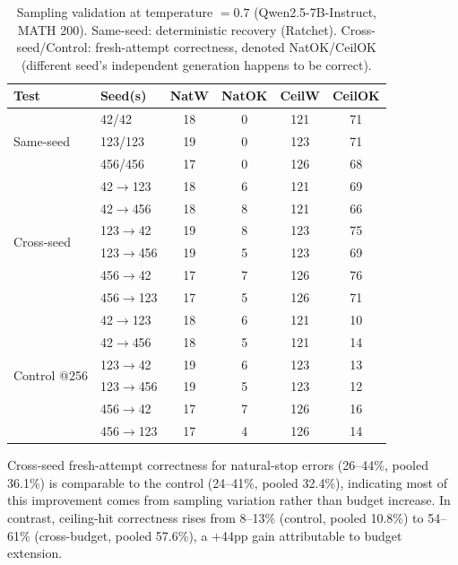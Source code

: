 \documentclass{article}
\begin{document}
\begin{table}[h]
\centering
\caption{Sampling validation at temperature $= 0.7$ (Qwen2.5-7B-Instruct, MATH 200). Same-seed: deterministic recovery (Ratchet). Cross-seed/Control: fresh-attempt correctness, denoted NatOK/CeilOK (different seed's independent generation happens to be correct).}
\label{tab:sampling}
\begin{tabular}{llcccc}
\toprule
\textbf{Test} & \textbf{Seed(s)} & \textbf{NatW} & \textbf{NatOK} & \textbf{CeilW} & \textbf{CeilOK} \\
\midrule
\multirow{3}{*}{Same-seed} & 42/42 & 18 & 0 & 121 & 71 \\
 & 123/123 & 19 & 0 & 123 & 71 \\
 & 456/456 & 17 & 0 & 126 & 68 \\
\midrule
\multirow{6}{*}{Cross-seed} & 42$\to$123 & 18 & 6 & 121 & 69 \\
 & 42$\to$456 & 18 & 8 & 121 & 66 \\
 & 123$\to$42 & 19 & 8 & 123 & 75 \\
 & 123$\to$456 & 19 & 5 & 123 & 69 \\
 & 456$\to$42 & 17 & 7 & 126 & 76 \\
 & 456$\to$123 & 17 & 5 & 126 & 71 \\
\midrule
\multirow{6}{*}{Control @256} & 42$\to$123 & 18 & 6 & 121 & 10 \\
 & 42$\to$456 & 18 & 5 & 121 & 14 \\
 & 123$\to$42 & 19 & 6 & 123 & 13 \\
 & 123$\to$456 & 19 & 5 & 123 & 12 \\
 & 456$\to$42 & 17 & 7 & 126 & 16 \\
 & 456$\to$123 & 17 & 4 & 126 & 14 \\
\bottomrule
\end{tabular}
\end{table}

Cross-seed fresh-attempt correctness for natural-stop errors (26--44\%, pooled 36.1\%) is comparable to the control (24--41\%, pooled 32.4\%), indicating most of this improvement comes from sampling variation rather than budget increase. In contrast, ceiling-hit correctness rises from 8--13\% (control, pooled 10.8\%) to 54--61\% (cross-budget, pooled 57.6\%), a +44pp gain attributable to budget extension.
\end{document}
